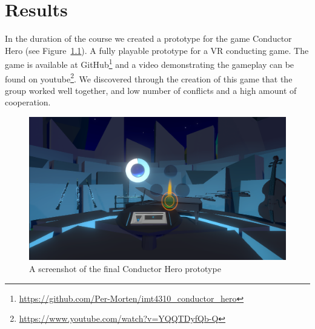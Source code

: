 \chapter{Results} \label{chap:results}
In the duration of the course we created a prototype for the game Conductor Hero (see Figure~\ref{fig:conductor_hero}). A fully playable prototype for a VR conducting game. The game is available at GitHub\footnote{\url{https://github.com/Per-Morten/imt4310_conductor_hero}} and a video demonstrating the gameplay can be found on youtube\footnote{\url{https://www.youtube.com/watch?v=YQQTDyfQb-Q}}. 
We discovered through the creation of this game that the group worked well together, and low number of conflicts and a high amount of cooperation.
\\ 
\begin{figure}[tpbh]
    \centering
    \includegraphics[width=1.0\textwidth]{images/cue}
    \caption[Conductor Hero]{A screenshot of the final Conductor Hero prototype}
    \label{fig:conductor_hero}
\end{figure}